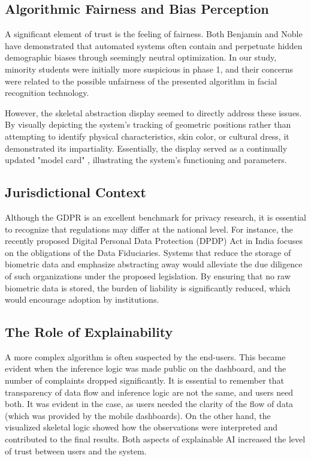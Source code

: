 \documentclass[conference]{IEEEtran}
\begin{document}
\subsection{Algorithmic Fairness and Bias Perception}
A significant element of trust is the feeling of fairness. Both Benjamin \cite{b15} and Noble \cite{b16} have demonstrated that automated systems often contain and perpetuate hidden demographic biases through seemingly neutral optimization. In our study, minority students were initially more suspicious in phase 1, and their concerns were related to the possible unfairness of the presented algorithm in facial recognition technology.

However, the skeletal abstraction display seemed to directly address these issues. By visually depicting the system's tracking of geometric positions rather than attempting to identify physical characteristics, skin color, or cultural dress, it demonstrated its impartiality. Essentially, the display served as a continually updated "model card" \cite{b17}, illustrating the system's functioning and parameters.

\subsection{Jurisdictional Context}
Although the GDPR \cite{b26} is an excellent benchmark for privacy research, it is essential to recognize that regulations may differ at the national level. For instance, the recently proposed Digital Personal Data Protection (DPDP) Act in India focuses on the obligations of the Data Fiduciaries. Systems that reduce the storage of biometric data and emphasize abstracting away would alleviate the due diligence of such organizations under the proposed legislation. By ensuring that no raw biometric data is stored, the burden of liability is significantly reduced, which would encourage adoption by institutions.

\subsection{The Role of Explainability}
A more complex algorithm is often suspected by the end-users. This became evident when the inference logic was made public on the dashboard, and the number of complaints dropped significantly. It is essential to remember that transparency of data flow and inference logic are not the same, and users need both. It was evident in the case, as users needed the clarity of the flow of data (which was provided by the mobile dashboards). On the other hand, the visualized skeletal logic showed how the observations were interpreted and contributed to the final results. Both aspects of explainable AI increased the level of trust between users and the system.
\end{document}
